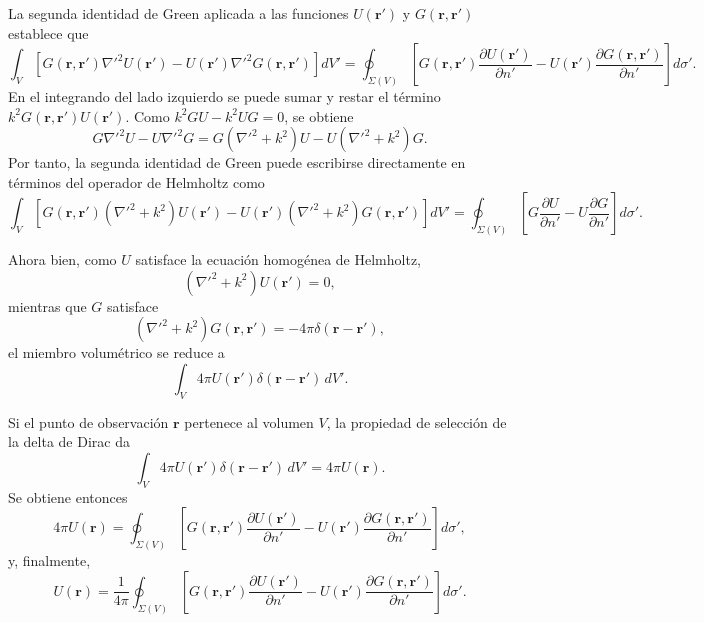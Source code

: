 La segunda identidad de Green aplicada a las funciones \(U(\mathbf r')\) y \(G(\mathbf r,\mathbf r')\) establece que
\begin{equation}
\int_V
\left[
G(\mathbf r,\mathbf r')\nabla'^2 U(\mathbf r')
-
U(\mathbf r')\nabla'^2 G(\mathbf r,\mathbf r')
\right]dV'
=
\oint_{\Sigma(V)}
\left[
G(\mathbf r,\mathbf r')
\frac{\partial U(\mathbf r')}{\partial n'}
-
U(\mathbf r')
\frac{\partial G(\mathbf r,\mathbf r')}{\partial n'}
\right]
d\sigma'.
\label{eq:second_Green_identity}
\end{equation}
En el integrando del lado izquierdo se puede sumar y restar el término \(k^2G(\mathbf r,\mathbf r')U(\mathbf r')\). Como \(k^2G U-k^2U G=0\), se obtiene
\begin{equation}
G\nabla'^2U-U\nabla'^2G
=
G(\nabla'^2+k^2)U
-
U(\nabla'^2+k^2)G.
\label{eq:Green_identity_Helmholtz_operator}
\end{equation}
Por tanto, la segunda identidad de Green puede escribirse directamente en términos del operador de Helmholtz como
\begin{equation}
\int_V
\left[
G(\mathbf r,\mathbf r')
(\nabla'^2+k^2)U(\mathbf r')
-
U(\mathbf r')
(\nabla'^2+k^2)G(\mathbf r,\mathbf r')
\right]dV'
=
\oint_{\Sigma(V)}
\left[
G\frac{\partial U}{\partial n'}
-
U\frac{\partial G}{\partial n'}
\right]
d\sigma'.
\label{eq:second_Green_identity_Helmholtz_operator}
\end{equation}

Ahora bien, como \(U\) satisface la ecuación homogénea de Helmholtz,
\begin{equation}
(\nabla'^2+k^2)U(\mathbf r')=0,
\end{equation}
mientras que \(G\) satisface
\begin{equation}
(\nabla'^2+k^2)G(\mathbf r,\mathbf r')
=
-4\pi\delta(\mathbf r-\mathbf r'),
\end{equation}
el miembro volumétrico se reduce a
\begin{equation}
\int_V
4\pi U(\mathbf r')\delta(\mathbf r-\mathbf r')\,dV'.
\end{equation}

Si el punto de observación \(\mathbf r\) pertenece al volumen \(V\), la propiedad de selección de la delta de Dirac da
\begin{equation}
\int_V
4\pi U(\mathbf r')\delta(\mathbf r-\mathbf r')\,dV'
=
4\pi U(\mathbf r).
\end{equation}
Se obtiene entonces
\begin{equation}
4\pi U(\mathbf r)
=
\oint_{\Sigma(V)}
\left[
G(\mathbf r,\mathbf r')
\frac{\partial U(\mathbf r')}{\partial n'}
-
U(\mathbf r')
\frac{\partial G(\mathbf r,\mathbf r')}{\partial n'}
\right]
d\sigma',
\end{equation}
y, finalmente,
\begin{equation}
U(\mathbf r)
=
\frac{1}{4\pi}
\oint_{\Sigma(V)}
\left[
G(\mathbf r,\mathbf r')
\frac{\partial U(\mathbf r')}{\partial n'}
-
U(\mathbf r')
\frac{\partial G(\mathbf r,\mathbf r')}{\partial n'}
\right]
d\sigma'.
\label{eq:Green_integral_theorem}
\end{equation}

